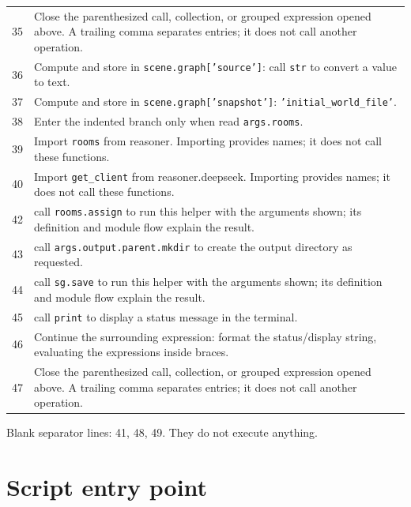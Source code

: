 \documentclass[11pt,a4paper]{book}
\begin{document}
\begin{longtable}{r p{}}
35 & Close the parenthesized call, collection, or grouped expression opened above. A trailing comma separates entries; it does not call another operation. \\

36 & Compute and store in \texttt{scene.graph['source']}: call \texttt{str} to convert a value to text.  \\

37 & Compute and store in \texttt{scene.graph['snapshot']}: \texttt{'initial\_world\_file'}.  \\

38 & Enter the indented branch only when read \texttt{args.rooms}. \\

39 & Import \texttt{rooms} from reasoner. Importing provides names; it does not call these functions. \\

40 & Import \texttt{get\_client} from reasoner.deepseek. Importing provides names; it does not call these functions. \\

42 & call \texttt{rooms.assign} to run this helper with the arguments shown; its definition and module flow explain the result. \\

43 & call \texttt{args.output.parent.mkdir} to create the output directory as requested. \\

44 & call \texttt{sg.save} to run this helper with the arguments shown; its definition and module flow explain the result. \\

45 & call \texttt{print} to display a status message in the terminal. \\

46 & Continue the surrounding expression: format the status/display string, evaluating the expressions inside braces. \\

47 & Close the parenthesized call, collection, or grouped expression opened above. A trailing comma separates entries; it does not call another operation. \\

\end{longtable}

Blank separator lines: 41, 48, 49. They do not execute anything.

\section{Script entry point}
\end{document}
